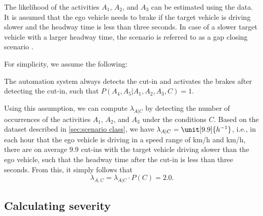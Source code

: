 The likelihood of the activities $A_1$, $A_2$, and $A_3$ can be estimated using the data. It is assumed that the ego vehicle needs to brake if the target vehicle is driving slower and the headway time is less than three seconds. In case of a slower target vehicle with a larger headway time, the scenario is referred to as a gap closing scenario \cite{semsarkazerooni2016cacc, gelder2016pacc}.

For simplicity, we assume the following:
\begin{assumption}
	The automation system always detects the cut-in and activates the brakes after detecting the cut-in, such that $P(A_4,A_5|A_1,A_2,A_3,C) = 1$.
\end{assumption}

Using this assumption, we can compute $\lambda_{A|C}$ by detecting the number of occurrences of the activities $A_1$, $A_2$, and $A_3$ under the conditions $C$. Based on the dataset described in \cref{sec:scenario class}, we have $\lambda_{A|C}=\unit[9.9]{h^{-1}}$, i.e., in each hour that the ego vehicle is driving in a speed range of \unit[60]{km/h} and \unit[130]{km/h}, there are on average $9.9$ cut-ins with the target vehicle driving slower than the ego vehicle, such that the headway time after the cut-in is less than three seconds. From this, it simply follows that
\begin{equation}
	\lambda_{A,C} = \lambda_{A|C} \cdot P(C) = 2.0.
\end{equation}



\subsection{Calculating severity}
\label{sec:example severity}

